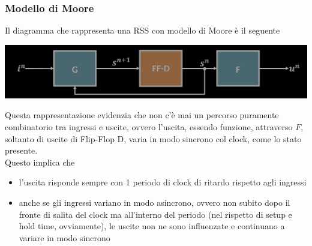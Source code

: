 \documentclass{article}
\begin{document}
\subsubsection{Modello di Moore}
Il diagramma che rappresenta una RSS con modello di Moore è il seguente
\begin{center}
    \includegraphics[scale=0.35]{moore-RSS.png}
\end{center}
Questa rappresentazione evidenzia che non c’è mai un percorso puramente combinatorio tra ingressi e uscite, ovvero l’uscita, essendo funzione, attraverso $F$, soltanto di uscite di Flip-Flop D, varia in modo sincrono col clock, come lo stato presente.
\vspace{0.1cm}\\
Questo implica che
\begin{itemize}
    \item l’uscita risponde sempre con 1 periodo di clock di ritardo rispetto agli ingressi
    \item anche se gli ingressi variano in modo asincrono, ovvero non subito dopo il fronte di salita del clock ma all’interno del periodo (nel rispetto di setup e hold time, ovviamente), le uscite non ne sono influenzate e continuano a variare in modo sincrono
\end{itemize}
\end{document}
